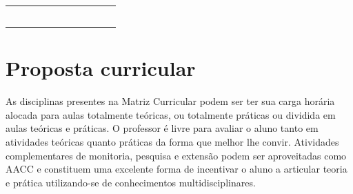 \begin{table}[tbp]
{\begin{tabular}{llllllllll}
			&                                                                                           &                                             &                                                                                   &                                       &                         &                         &                                       &                                    &  \\
			&                                                                                           &                                             &                                                                                   &                                       &                         &                         &                                       &                                    &  \\
			&                                                                                           &                                             &                                                                                   &                                       &                         &                         &                                       &                                    &  \\
			& {\color[HTML]{009901} }                                                                   & {\color[HTML]{009901} }                     & {\color[HTML]{009901} }                                                           & {\color[HTML]{009901} }               & {\color[HTML]{009901} } & {\color[HTML]{009901} } & {\color[HTML]{009901} }               & {\color[HTML]{009901} }            &  \\
			&                                                                                           &                                             & \textbf{}                                                                         & \textbf{}                             &                         &                         &                                       &                                    & 
		\end{tabular}%
	}
\end{table}

\section{Proposta curricular}
As disciplinas presentes na Matriz Curricular podem ser ter sua carga horária alocada para aulas totalmente teóricas, ou totalmente práticas ou dividida em aulas teóricas e práticas. O professor é livre para avaliar o aluno tanto em atividades teóricas quanto práticas da forma que melhor lhe convir. Atividades complementares de monitoria, pesquisa e extensão podem ser aproveitadas como AACC e constituem uma excelente forma de incentivar o aluno a articular teoria e prática utilizando-se de conhecimentos multidisciplinares. 

